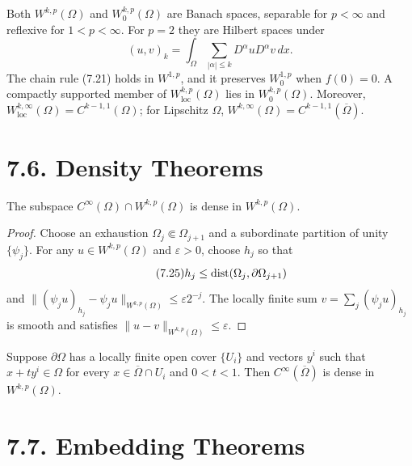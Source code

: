 Both $W^{k,p}(\Omega)$ and $W_0^{k,p}(\Omega)$ are Banach spaces, separable
for $p<\infty$ and reflexive for $1<p<\infty$. For $p=2$ they are Hilbert
spaces under
\begin{equation}
\tag{7.24}
(u,v)_k=\int_\Omega\sum_{|\alpha|\leq k}D^\alpha uD^\alpha v\,dx.
\end{equation}
The chain rule (7.21) holds in $W^{1,p}$, and it preserves $W_0^{1,p}$ when
$f(0)=0$. A compactly supported member of $W^{k,p}_{\mathrm{loc}}(\Omega)$
lies in $W_0^{k,p}(\Omega)$. Moreover,
$W^{k,\infty}_{\mathrm{loc}}(\Omega)=C^{k-1,1}(\Omega)$; for Lipschitz
$\Omega$, $W^{k,\infty}(\Omega)=C^{k-1,1}(\overline\Omega)$.

\section*{7.6. Density Theorems}

\begin{theorem}
\label{gt:thm-sobolev-density-smooth}
The subspace $C^\infty(\Omega)\cap W^{k,p}(\Omega)$ is dense in
$W^{k,p}(\Omega)$.
\end{theorem}
\begin{proof}
\sketch Choose an exhaustion $\Omega_j\Subset\Omega_{j+1}$ and a subordinate
partition of unity $\{\psi_j\}$. For any $u\in W^{k,p}(\Omega)$ and
$\varepsilon>0$, choose $h_j$ so that
\begin{equation}
\tag{7.25}
h_j\leq\operatorname{dist}(\Omega_j,\partial\Omega_{j+1})
\end{equation}
and
$\|(\psi_ju)_{h_j}-\psi_ju\|_{W^{k,p}(\Omega)}\leq\varepsilon 2^{-j}$.
The locally finite sum $v=\sum_j(\psi_ju)_{h_j}$ is smooth and satisfies
$\|u-v\|_{W^{k,p}(\Omega)}\leq\varepsilon$.
\end{proof}

\begin{proposition}
\label{gt:prop-sobolev-segment-density}
Suppose $\partial\Omega$ has a locally finite open cover $\{U_i\}$ and vectors
$y^i$ such that $x+ty^i\in\Omega$ for every
$x\in\overline\Omega\cap U_i$ and $0<t<1$. Then
$C^\infty(\overline\Omega)$ is dense in $W^{k,p}(\Omega)$.
\end{proposition}

\section*{7.7. Embedding Theorems}

